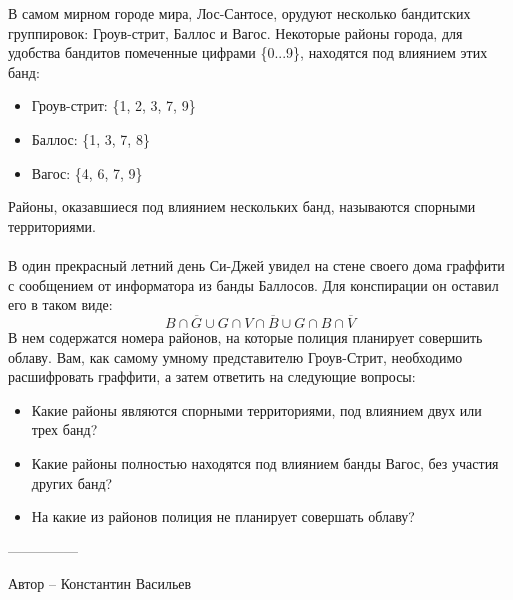 \question
В самом мирном городе мира, Лос-Сантосе, орудуют несколько бандитских группировок: Гроув-стрит, Баллос и Вагос. Некоторые районы города, для удобства бандитов помеченные цифрами \{0...9\}, находятся под влиянием этих банд:
\begin{itemize}
    \item Гроув-стрит: \{1, 2, 3, 7, 9\}
    \item Баллос: \{1, 3, 7, 8\}
    \item Вагос: \{4, 6, 7, 9\}
\end{itemize}
Районы, оказавшиеся под влиянием нескольких банд, называются спорными территориями. 
\\
\\
В один прекрасный летний день Си-Джей увидел на стене своего дома граффити с сообщением от информатора из банды Баллосов. Для конспирации он оставил его в таком виде:
\begin{equation*}
B \cap \overline{G} \cup G \cap V \cap \overline{B} \cup G \cap B \cap \overline{V}
\end{equation*}
В нем содержатся номера районов, на которые полиция планирует совершить облаву. Вам, как самому умному представителю Гроув-Стрит, необходимо расшифровать граффити, а затем ответить на следующие вопросы:

\begin{itemize}
    \item Какие районы являются спорными территориями, под влиянием двух или трех банд?
    \item Какие районы полностью находятся под влиянием банды Вагос, без участия других банд?
    \item На какие из районов полиция не планирует совершать облаву?
\end{itemize}

---------------

Автор -- Константин Васильев